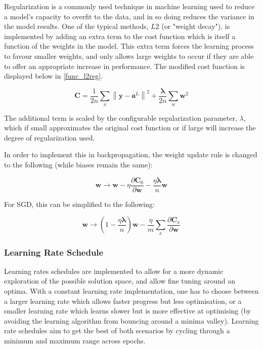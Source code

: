 \documentclass[a4paper,11pt,oneside]{article}
\theoremstyle{plain}
\theoremstyle{definition}
\begin{document}
	Regularization is a commonly used technique in machine learning used to reduce a model's capacity to overfit to the data, and in so doing reduces the variance in the model results. One of the typical methods, $L2$ (or "weight decay"), is implemented by adding an extra term to the cost function which is itself a function of the weights in the model. This extra term forces the learning process to favour smaller weights, and only allows large weights to occur if they are able to offer an appropriate increase in performance. The modified cost function is displayed below in \ref{func_l2reg}.
	
	\begin{equation}\label{func_l2reg}
	\mathbf{C}=\frac{1}{2 n} \sum_{x}\left\|\mathbf{y}-\mathbf{a}^{L}\right\|^{2}+\frac{\mathbf{\lambda}}{2 n} \sum_{w} \mathbf{w}^{2}
	\end{equation}
	
	The additional term is scaled by the configurable regularization parameter, $\lambda$, which if small approximates the original cost function or if large will increase the degree of regularization used. \newline
	
	In order to implement this in backpropagation, the weight update rule is changed to the following (while biases remain the same):
	
	\begin{equation}\label{func_l2_weight_update}
	\mathbf{w} \rightarrow \mathbf{w}-\eta \frac{\partial \mathbf{C}_{0}}{\partial \mathbf{w}}-\frac{\eta \mathbf{\lambda}}{n} \mathbf{w}
	\end{equation}
	
	For SGD, this can be simplified to the following: 
	
	\begin{equation}\label{func_sgd_l2}
	\mathbf{w} \rightarrow\left(1-\frac{\eta \mathbf{\lambda}}{n}\right) \mathbf{w}-\frac{\eta}{m} \sum_{x} \frac{\partial \mathbf{C}_{x}}{\partial \mathbf{w}}
	\end{equation}
	
	
	\subsubsection{Learning Rate Schedule}\label{imp_learning_rate_schedule}
	
	Learning rates schedules are implemented to allow for a more dynamic exploration of the possible solution space, and allow fine tuning around an optima. With a constant learning rate implementation, one has to choose between a larger learning rate which allows faster progress but less optimisation, or a smaller learning rate which learns slower but is more effective at optimising (by avoiding the learning algorithm from bouncing around a minima valley). Learning rate schedules aim to get the best of both scenarios by cycling through a minimum and maximum range across epochs.\newline
	
\end{document}
